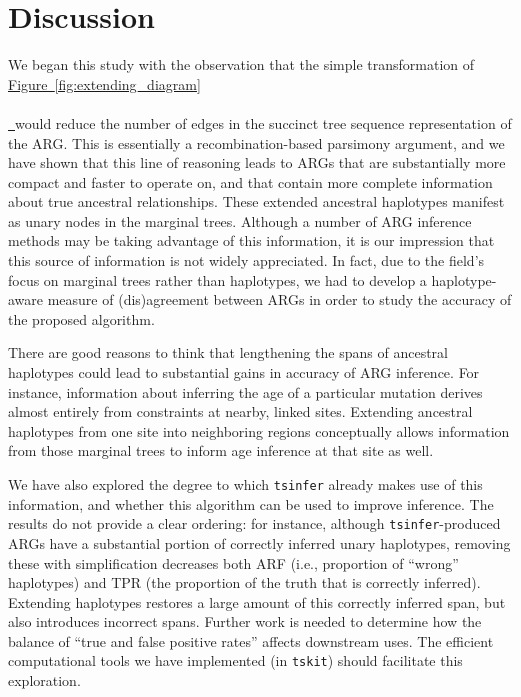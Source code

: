 \documentclass[10pt,twoside,lineno]{gsajnl}
\newcommand{\tskit}{\texttt{tskit}}
\newcommand{\tsinfer}{\texttt{tsinfer}}
\newcommand*{\figref}[2][]{%
	\hyperref[{#2}]{%
		Figure~\ref*{#2}%
		\ifx\\#1\\%
		\else
		\,#1%
		\fi
	}%
}
\begin{document}
\section{Discussion}

We began this study with the observation that the simple transformation
of \figref{fig:extending_diagram} would reduce the number of edges
in the succinct tree sequence representation of the ARG.
This is essentially a recombination-based parsimony argument,
and we have shown that this line of reasoning
leads to ARGs that are substantially more compact and faster to operate on,
and that contain more complete information about true ancestral relationships.
These extended ancestral haplotypes manifest as unary nodes in the marginal trees.
Although a number of ARG inference methods may be taking advantage of this information,
it is our impression that this source of information is not widely appreciated.
In fact, due to the field's focus on marginal trees rather than haplotypes,
we had to develop a haplotype-aware measure of (dis)agreement between ARGs in order to study the accuracy of the proposed algorithm.

There are good reasons to think that lengthening the spans of ancestral haplotypes
could lead to substantial gains in accuracy of ARG inference.
For instance, information about inferring the age of a particular mutation
derives almost entirely from constraints at nearby, linked sites.
Extending ancestral haplotypes from one site into neighboring regions
conceptually allows information from those marginal trees
to inform age inference at that site as well.

We have also explored the degree to which \tsinfer{} already makes use of this information,
and whether this algorithm can be used to improve inference.
The results do not provide a clear ordering:
for instance, although \tsinfer-produced ARGs
have a substantial portion of correctly inferred unary haplotypes,
removing these with simplification decreases both ARF
(i.e., proportion of ``wrong'' haplotypes)
and TPR (the proportion of the truth that is correctly inferred).
Extending haplotypes restores a large amount of this correctly inferred span,
but also introduces incorrect spans.
Further work is needed to determine how the balance of ``true and false positive rates''
affects downstream uses.
The efficient computational tools we have implemented (in \tskit{})
should facilitate this exploration.
\end{document}
